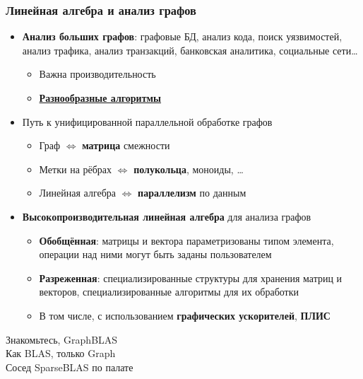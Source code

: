 \documentclass[xcolor=table,aspectratio=169]{beamer}
\begin{document}
\begin{frame}[fragile]
  \frametitle{Линейная алгебра и анализ графов}
  \begin{itemize}
    \item \textbf{Анализ больших графов}: графовые БД, анализ кода, поиск уязвимостей, анализ трафика, анализ транзакций, банковская аналитика, социальные сети\ldots
      \begin{itemize}
        \item Важна производительность
        \item \underline{\textbf{Разнообразные алгоритмы}}
      \end{itemize}
    \pause  
    \item Путь к унифицированной параллельной обработке графов  
      \begin{itemize}
        \item Граф $\iff$ \textbf{матрица} смежности
        \item Метки на рёбрах $\iff$ \textbf{полукольца}, моноиды, \ldots
        \item Линейная алгебра $\iff$ \textbf{параллелизм} по данным
      \end{itemize}
    \pause  
    \item \textbf{Высокопроизводительная линейная алгебра} для анализа графов
      \begin{itemize}
        \item \textbf{Обобщённая}: матрицы и вектора параметризованы типом элемента, операции над ними могут быть заданы пользователем
        \item \textbf{Разреженная}: специализированные структуры для хранения матриц и векторов, специализированные алгоритмы для их обработки 
        \item В том числе, с использованием \textbf{графических ускорителей}, \textbf{ПЛИС}
      \end{itemize}
    \end{itemize}
\end{frame}

\begin{frame}
  \begin{center}
    {\huge Знакомьтесь, GraphBLAS}
     \\
     Как BLAS, только Graph
     \\
     {\tiny Сосед SparseBLAS по палате}
  \end{center}
\end{frame}
\end{document}
